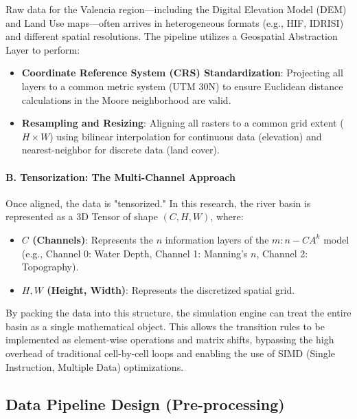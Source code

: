 Raw data for the Valencia region—including the Digital Elevation Model (DEM) and Land Use maps—often arrives in heterogeneous formats 
(e.g., HIF, IDRISI) and different spatial resolutions. The pipeline utilizes a Geospatial Abstraction Layer to perform:

\begin{itemize}
    \item \textbf{Coordinate Reference System (CRS) Standardization}: Projecting all layers to a common metric system (UTM 30N) to ensure Euclidean distance calculations in the Moore neighborhood are valid.

    \item \textbf{Resampling and Resizing}: Aligning all rasters to a common grid extent ($H \times W$) using bilinear interpolation for continuous data (elevation) and nearest-neighbor for discrete data (land cover).
\end{itemize}

\paragraph{B. Tensorization: The Multi-Channel Approach}

Once aligned, the data is "tensorized." In this research, the river basin is represented as a 3D Tensor of shape $(C, H, W)$, where:

\begin{itemize}
    \item \textbf{$C$ (Channels)}: Represents the $n$ information layers of the $m:n-CA^k$ model (e.g., Channel 0: Water Depth, Channel 1: Manning’s $n$, Channel 2: Topography).

    \item \textbf{$H, W$ (Height, Width)}: Represents the discretized spatial grid.
\end{itemize}

By packing the data into this structure, the simulation engine can treat the entire basin as a single mathematical object. This allows 
the transition rules to be implemented as element-wise operations and matrix shifts, bypassing the high overhead of traditional 
cell-by-cell loops and enabling the use of SIMD (Single Instruction, Multiple Data) optimizations.


\subsection{Data Pipeline Design (Pre-processing)}

